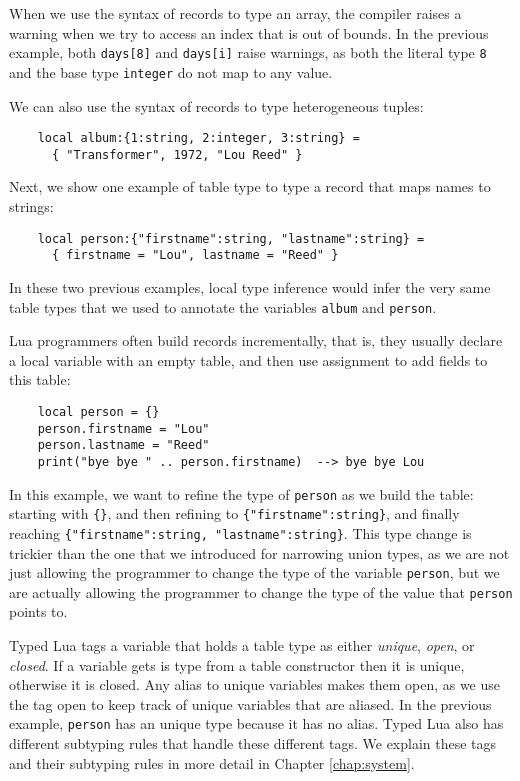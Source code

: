 When we use the syntax of records to type an array, the compiler
raises a warning when we try to access an index that is out of bounds.
In the previous example, both \texttt{days[8]} and \texttt{days[i]}
raise warnings, as both the literal type \texttt{8} and the base type
\texttt{integer} do not map to any value.

We can also use the syntax of records to type heterogeneous tuples:
\begin{verbatim}
    local album:{1:string, 2:integer, 3:string} =
      { "Transformer", 1972, "Lou Reed" }
\end{verbatim}

Next, we show one example of table type to type a record that maps
names to strings:
\begin{verbatim}
    local person:{"firstname":string, "lastname":string} =
      { firstname = "Lou", lastname = "Reed" } 
\end{verbatim}

In these two previous examples, local type inference would infer the
very same table types that we used to annotate the variables
\texttt{album} and \texttt{person}.

Lua programmers often build records incrementally, that is,
they usually declare a local variable with an empty table,
and then use assignment to add fields to this table:
\begin{verbatim}
    local person = {}
    person.firstname = "Lou"
    person.lastname = "Reed"
    print("bye bye " .. person.firstname)  --> bye bye Lou
\end{verbatim}

In this example, we want to refine the type of \texttt{person} as
we build the table:
starting with \texttt{\{\}}, and then refining to \texttt{\{"firstname":string\}},
and finally reaching \texttt{\{"firstname":string, "lastname":string\}}.
This type change is trickier than the one that we introduced for narrowing
union types, as we are not just allowing the programmer to change
the type of the variable \texttt{person}, but we are actually allowing
the programmer to change the type of the value that \texttt{person} points to.

Typed Lua tags a variable that holds a table type as either
\emph{unique}, \emph{open}, or \emph{closed}.
If a variable gets is type from a table constructor then it is
unique, otherwise it is closed.
Any alias to unique variables makes them open, as we use the
tag open to keep track of unique variables that are aliased.
In the previous example, \texttt{person} has an unique type
because it has no alias.
Typed Lua also has different subtyping rules that handle these
different tags.
We explain these tags and their subtyping rules in more detail
in Chapter \ref{chap:system}.

